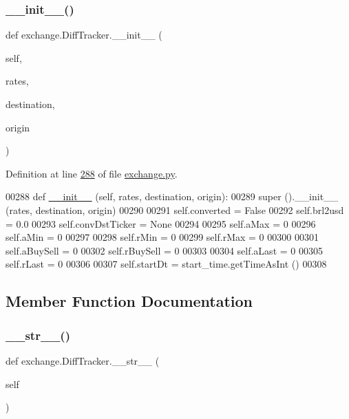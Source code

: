 \subsubsection{\texorpdfstring{\+\_\+\+\_\+init\+\_\+\+\_\+()}{\_\_init\_\_()}}
{\footnotesize\ttfamily def exchange.\+Diff\+Tracker.\+\_\+\+\_\+init\+\_\+\+\_\+ (\begin{DoxyParamCaption}\item[{}]{self,  }\item[{}]{rates,  }\item[{}]{destination,  }\item[{}]{origin }\end{DoxyParamCaption})}



Definition at line \hyperlink{exchange_8py_source_l00288}{288} of file \hyperlink{exchange_8py_source}{exchange.\+py}.


\begin{DoxyCode}
00288     \textcolor{keyword}{def }\hyperlink{namespacestart__time_a9c9bd378729a13c96a22c8b079ea172c}{\_\_init\_\_} (self, rates, destination, origin):
00289         super ().\_\_init\_\_ (rates, destination, origin)
00290         
00291         self.converted = \textcolor{keyword}{False} 
00292         self.brl2usd = 0.0
00293         self.convDstTicker = \textcolor{keywordtype}{None}
00294         
00295         self.aMax = 0
00296         self.aMin = 0
00297         
00298         self.rMin = 0
00299         self.rMax = 0
00300         
00301         self.aBuySell  = 0
00302         self.rBuySell = 0
00303         
00304         self.aLast = 0
00305         self.rLast = 0
00306         
00307         self.startDt = start\_time.getTimeAsInt ()
00308         
\end{DoxyCode}


\subsection{Member Function Documentation}
\mbox{\label{classexchange_1_1_diff_tracker_a72214c03506722b0554e433615bff766}} 
\subsubsection{\texorpdfstring{\+\_\+\+\_\+str\+\_\+\+\_\+()}{\_\_str\_\_()}}
{\footnotesize\ttfamily def exchange.\+Diff\+Tracker.\+\_\+\+\_\+str\+\_\+\+\_\+ (\begin{DoxyParamCaption}\item[{}]{self }\end{DoxyParamCaption})}



